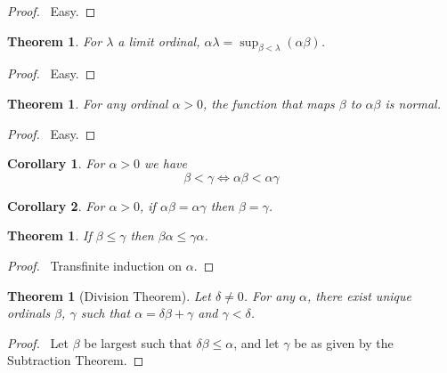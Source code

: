 \documentclass{article}
\let\qed\relax
\newtheorem{theorem}[axiom]{Theorem}
\newtheorem{corollary}{Corollary}[axiom]
\theoremstyle{definition}
\begin{document}
    \begin{proof}
        \pf\ Easy. \qed
    \end{proof}

    \begin{theorem}
        For $\lambda$ a limit ordinal, $\alpha \lambda = \sup_{\beta < \lambda} (\alpha \beta)$.
    \end{theorem}

    \begin{proof}
        \pf\ Easy. \qed
    \end{proof}

    \begin{theorem}
        For any ordinal $\alpha > 0$, the function that maps $\beta$ to $\alpha \beta$ is normal.
    \end{theorem}

    \begin{proof}
        \pf\ Easy. \qed
    \end{proof}

    \begin{corollary}
        For $\alpha > 0$ we have
        \[ \beta < \gamma \Leftrightarrow \alpha \beta < \alpha \gamma \]
    \end{corollary}
    
    \begin{corollary}
        For $\alpha > 0$, if $\alpha \beta = \alpha \gamma$ then $\beta = \gamma$.
    \end{corollary}

    \begin{theorem}
        If $\beta \leq \gamma$ then $\beta \alpha \leq \gamma \alpha$.
    \end{theorem}

    \begin{proof}
        \pf\ Transfinite induction on $\alpha$. \qed
    \end{proof}

    \begin{theorem}[Division Theorem]
        Let $\delta \neq 0$. For any $\alpha$, there exist unique ordinals $\beta$, $\gamma$ such that
        $\alpha = \delta \beta + \gamma$ and $\gamma < \delta$.
    \end{theorem}

    \begin{proof}
        \pf\ Let $\beta$ be largest such that $\delta \beta \leq \alpha$, and let $\gamma$ be as given by
        the Subtraction Theorem. \qed
    \end{proof}
\end{document}
